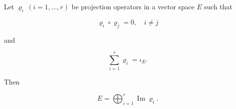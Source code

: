 Let $\varrho_i\ (i = 1, \dots, r)$ be projection operators in a vector space $E$ such that

$$
\varrho_i \circ \varrho_j = 0, \quad i \neq j
$$

and

$$
\sum_{i=1}^{r} \varrho_i = \iota_E.
$$

Then

$$
E = \bigoplus_{i=1}^{r} \operatorname{Im} \varrho_i.
$$
